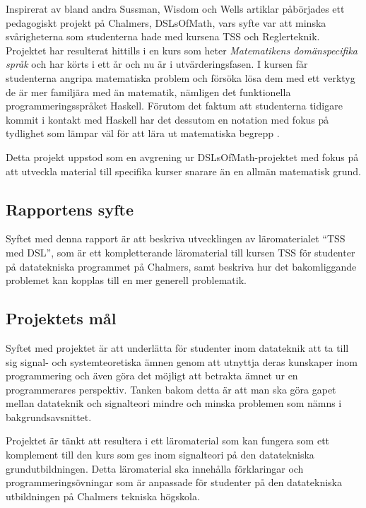 \documentclass[]{article}
\begin{document}
Inspirerat av bland andra Sussman, Wisdom och Wells artiklar påbörjades ett
pedagogiskt projekt på Chalmers, DSLsOfMath, vars syfte var att minska
svårigheterna som studenterna hade med kursena TSS och Reglerteknik.
Projektet har resulterat hittills i en kurs som heter
\textit{Matematikens domänspecifika språk} och har körts i ett år och nu
är i utvärderingsfasen. I kursen får studenterna angripa
matematiska problem och försöka lösa dem med ett verktyg de är
mer familjära med än matematik, nämligen det funktionella
programmeringsspråket Haskell. Förutom det faktum att studenterna tidigare
kommit i kontakt med Haskell har det dessutom en notation med fokus på
tydlighet som lämpar väl för att lära ut matematiska begrepp
\cite{TFPIE15_DSLsofMath_IonescuJansson}.

Detta projekt uppstod som en avgrening ur DSLsOfMath-projektet med fokus
på att utveckla material till specifika kurser snarare än en allmän matematisk grund.

\subsection{Rapportens syfte}


Syftet med denna rapport är att beskriva utvecklingen av läromaterialet
``TSS med DSL'', som är ett kompletterande läromaterial till kursen TSS
för studenter på datatekniska programmet på Chalmers,
samt beskriva hur det bakomliggande problemet kan kopplas till en mer
generell problematik.

\subsection{Projektets mål}
Syftet med projektet är att underlätta för studenter inom datateknik att
ta till sig signal- och systemteoretiska ämnen genom att utnyttja deras
kunskaper inom programmering och även göra det möjligt att betrakta ämnet ur
en programmerares perspektiv. Tanken bakom detta är att man ska göra gapet
mellan datateknik och signalteori mindre och minska problemen som nämns
i bakgrundsavsnittet.

Projektet är tänkt att resultera i ett läromaterial som kan fungera som ett
komplement till den kurs som ges inom signalteori på den datatekniska
grundutbildningen. Detta läromaterial ska innehålla förklaringar och
programmeringsövningar som är anpassade för studenter på den datatekniska
utbildningen på Chalmers tekniska högskola.
\end{document}
